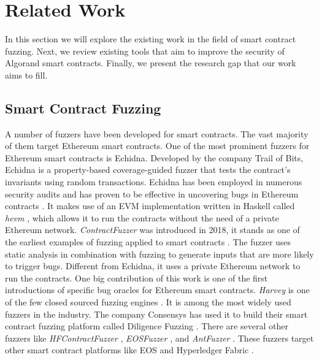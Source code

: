 
\section{Related Work}
In this section we will explore the existing work in the field of smart contract fuzzing. Next, we review existing tools that aim to improve the security of Algorand smart contracts. Finally, we present the research gap that our work aims to fill.

\subsection*{Smart Contract Fuzzing}
A number of fuzzers have been developed for smart contracts.
The vast majority of them target Ethereum smart contracts.
One of the most prominent fuzzers for Ethereum smart contracts is Echidna.
Developed by the company Trail of Bits, Echidna is a property-based coverage-guided fuzzer that tests the contract's invariants using random transactions.
Echidna has been employed in numerous security audits and has proven to be effective in uncovering bugs in Ethereum contracts \cite{grieco_echidna_2020,noauthor_echidna_nodate}.
It makes use of an EVM implementation written in Haskell called \textit{hevm} \cite{noauthor_haskell_nodate}, which allows it to run the contracts without the need of a private Ethereum network.
\emph{ContractFuzzer} was introduced in 2018, it stands as one of the earliest examples of fuzzing applied to smart contracts \cite{jiang_contractfuzzer_2018}.
The fuzzer uses static analysis in combination with fuzzing to generate inputs that are more likely to trigger bugs.
Different from Echidna, it uses a private Ethereum network to run the contracts.
One big contribution of this work is one of the first introductions of specific bug oracles for Ethereum smart contracts.
\emph{Harvey} is one of the few closed sourced fuzzing engines \cite{wustholz_harvey_2020}.
It is among the most widely used fuzzers in the industry.
The company Consensys has used it to build their smart contract fuzzing platform called Diligence Fuzzing \cite{consensys_ag_lets_nodate}.
There are several other fuzzers like \emph{HFContractFuzzer} \cite{ding_hfcontractfuzzer_2021}, \emph{EOSFuzzer} \cite{huang_eosfuzzer_2021}, and \emph{AntFuzzer} \cite{zhou_antfuzzer_2022}.
These fuzzers target other smart contract platforms like EOS \cite{noauthor_home_nodate} and Hyperledger Fabric \cite{noauthor_hyperledger_nodate}.

